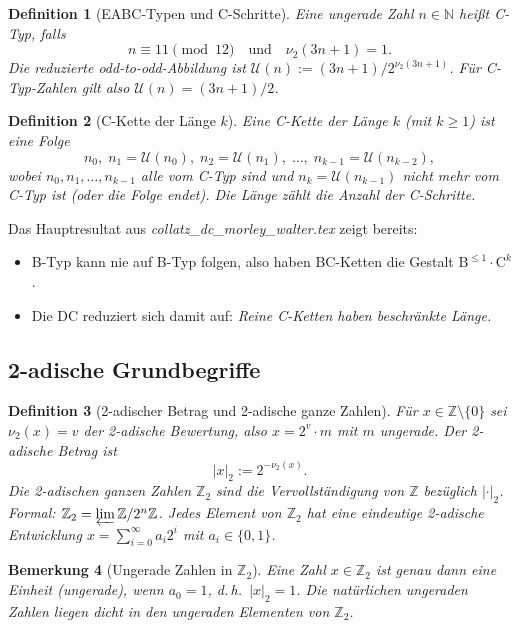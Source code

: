 \documentclass[12pt,a4paper]{article}
\newtheorem{definition}{Definition}[section]
\newtheorem{bemerkung}[definition]{Bemerkung}
\newcommand{\vii}{\nu_2}
\newcommand{\U}{\mathcal{U}}
\newcommand{\N}{\mathbb{N}}
\newcommand{\Z}{\mathbb{Z}}
\newcommand{\Ztwo}{\mathbb{Z}_2}     %
\newcommand{\abs}[1]{\lvert#1\rvert}
\newcommand{\atwo}[1]{\lvert#1\rvert_2}  %
\begin{document}
\begin{definition}[EABC-Typen und C-Schritte]
Eine ungerade Zahl $n \in \N$ heißt \emph{C-Typ}, falls
\[
  n \equiv 11 \pmod{12}
  \quad\text{und}\quad
  \vii(3n+1) = 1.
\]
Die reduzierte odd-to-odd-Abbildung ist $\U(n) := (3n+1)/2^{\vii(3n+1)}$.
Für C-Typ-Zahlen gilt also $\U(n) = (3n+1)/2$.
\end{definition}

\begin{definition}[C-Kette der Länge $k$]
\label{def:ckette}
Eine \emph{C-Kette der Länge $k$} (mit $k \geq 1$) ist eine Folge
\[
  n_0,\; n_1 = \U(n_0),\; n_2 = \U(n_1),\; \ldots,\; n_{k-1} = \U(n_{k-2}),
\]
wobei $n_0, n_1, \ldots, n_{k-1}$ alle vom C-Typ sind und $n_k = \U(n_{k-1})$
\emph{nicht} mehr vom C-Typ ist (oder die Folge endet). Die Länge zählt die
Anzahl der C-Schritte.
\end{definition}

Das Hauptresultat aus \textit{collatz\_dc\_morley\_walter.tex} zeigt bereits:
\begin{itemize}
  \item B-Typ kann nie auf B-Typ folgen, also haben BC-Ketten die Gestalt
        $\mathrm{B}^{\leq 1} \cdot \mathrm{C}^k$.
  \item Die DC reduziert sich damit auf: \emph{Reine C-Ketten haben beschränkte Länge.}
\end{itemize}

\subsection{2-adische Grundbegriffe}

\begin{definition}[2-adischer Betrag und 2-adische ganze Zahlen]
Für $x \in \Z \setminus \{0\}$ sei $\vii(x) = v$ der 2-adische Bewertung,
also $x = 2^v \cdot m$ mit $m$ ungerade. Der \emph{2-adische Betrag} ist
\[
  \atwo{x} := 2^{-\vii(x)}.
\]
Die \emph{2-adischen ganzen Zahlen} $\Ztwo$ sind die Vervollständigung von
$\Z$ bezüglich $\abs{\cdot}_2$. Formal: $\Ztwo = \varprojlim \Z/2^n\Z$.
Jedes Element von $\Ztwo$ hat eine eindeutige 2-adische Entwicklung
$x = \sum_{i=0}^\infty a_i 2^i$ mit $a_i \in \{0,1\}$.
\end{definition}

\begin{bemerkung}[Ungerade Zahlen in $\Ztwo$]
Eine Zahl $x \in \Ztwo$ ist genau dann eine Einheit (ungerade), wenn $a_0 = 1$,
d.\,h.\ $\atwo{x} = 1$. Die natürlichen ungeraden Zahlen liegen dicht in den
ungeraden Elementen von $\Ztwo$.
\end{bemerkung}
\end{document}
